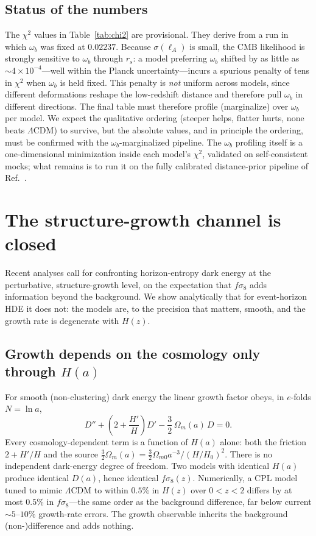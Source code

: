 \documentclass[twocolumn,10pt]{article}
\begin{document}
\subsection{Status of the numbers}
\label{sec:disc-caveat}

The $\chi^2$ values in Table~\ref{tab:chi2} are provisional. They derive from a
run in which $\omega_b$ was fixed at $0.02237$. Because $\sigma(\ell_A)$ is
small, the CMB likelihood is strongly sensitive to $\omega_b$ through $r_s$: a
model preferring $\omega_b$ shifted by as little as $\sim4\times10^{-4}$---well
within the Planck uncertainty---incurs a spurious penalty of tens in $\chi^2$
when $\omega_b$ is held fixed. This penalty is \emph{not} uniform across models,
since different deformations reshape the low-redshift distance and therefore
pull $\omega_b$ in different directions. The final table must therefore profile
(marginalize) over $\omega_b$ per model. We expect the qualitative ordering
(steeper helps, flatter hurts, none beats $\Lambda$CDM) to survive, but the
absolute values, and in principle the ordering, must be confirmed with the
$\omega_b$-marginalized pipeline. The $\omega_b$ profiling itself is a
one-dimensional minimization inside each model's $\chi^2$, validated on
self-consistent mocks; what remains is to run it on the fully calibrated
distance-prior pipeline of Ref.~\cite{StepPaper}.

\section{The structure-growth channel is closed}
\label{sec:pert}

Recent analyses call for confronting horizon-entropy dark energy at the
perturbative, structure-growth level, on the expectation that $f\sigma_8$
adds information beyond the background. We show analytically that for
event-horizon HDE it does not: the models are, to the precision that matters,
smooth, and the growth rate is degenerate with $H(z)$.

\subsection{Growth depends on the cosmology only through $H(a)$}

For smooth (non-clustering) dark energy the linear growth factor obeys, in
$e$-folds $N=\ln a$,
\begin{equation}
D''+\left(2+\frac{H'}{H}\right)D'-\frac{3}{2}\,\Omega_m(a)\,D=0 .
\label{eq:growth}
\end{equation}
Every cosmology-dependent term is a function of $H(a)$ alone: both the
friction $2+H'/H$ and the source $\tfrac32\Omega_m(a)=\tfrac32
\Omega_{m0}a^{-3}/(H/H_0)^2$. There is no independent dark-energy degree of
freedom. Two models with identical $H(a)$ produce identical $D(a)$, hence
identical $f\sigma_8(z)$. Numerically, a CPL model tuned to mimic $\Lambda$CDM
to within $0.5\%$ in $H(z)$ over $0<z<2$ differs by at most $0.5\%$ in
$f\sigma_8$---the same order as the background difference, far below current
$\sim5$--$10\%$ growth-rate errors. The growth observable inherits the
background (non-)difference and adds nothing.
\end{document}
